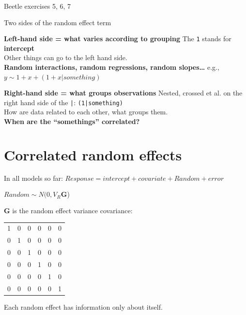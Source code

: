 \documentclass{beamer}
\begin{document}
\begin{frame}{Beetle exercises 5, 6, 7}
 
\end{frame}

\begin{frame}{Two sides of the random effect term}

\begin{alertblock}{\textbf{Left-hand side = what varies according to grouping}}
The \texttt{1} stands for \textbf{intercept}\\
Other things can go to the left hand side. \\
\textbf{Random interactions, random regressions, random slopes\dots}
 e.g., $y \sim 1 + x + (1 + x | something)$
\end{alertblock}
 
 \pause 
 
\begin{alertblock}{\textbf{Right-hand side = what groups observations}}
Nested, crossed et al. on the right hand side of the \texttt{|}: \texttt{(1|something)}\\
How are data related to each other, what groups them.\\
\textbf{When are the ``somethings'' correlated?}
\end{alertblock}


\end{frame}

\section{Correlated random effects}

\begin{frame}{In all models so far:}
$Response = intercept + covariate + Random + error$

$Random \sim N(0, V_{R} \mathbf{G} $)

$\mathbf{G}$ is the random effect variance covariance:
 
 \begin{center}
 \begin{tabular}[t]{cccccc}
1 & 0 & 0 & 0 & 0 & 0\\
0 & 1 & 0 & 0 & 0 & 0\\
0 & 0 & 1 & 0 & 0 & 0\\
0 & 0 & 0 & 1 & 0 & 0\\
0 & 0 & 0 & 0 & 1 & 0\\
0 & 0 & 0 & 0 & 0 & 1
 \end{tabular}
 \end{center}

 Each random effect has information only about itself.
 
\end{frame}
\end{document}
